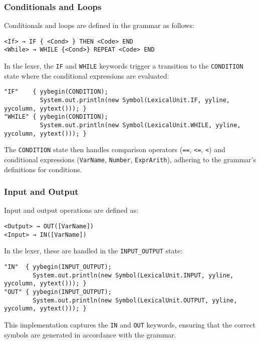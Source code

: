 \documentclass{article}
\begin{document}
	\subsubsection{Conditionals and Loops}
	Conditionals and loops are defined in the grammar as follows:

	\begin{verbatim}
<If> → IF { <Cond> } THEN <Code> END
<While> → WHILE {<Cond>} REPEAT <Code> END
	\end{verbatim}

	In the lexer, the \texttt{IF} and \texttt{WHILE} keywords trigger a transition to the \texttt{CONDITION} state where the conditional expressions are evaluated:

	\begin{verbatim}
"IF"    { yybegin(CONDITION);
          System.out.println(new Symbol(LexicalUnit.IF, yyline, yycolumn, yytext())); }
"WHILE" { yybegin(CONDITION);
          System.out.println(new Symbol(LexicalUnit.WHILE, yyline, yycolumn, yytext())); }
	\end{verbatim}

	The \texttt{CONDITION} state then handles comparison operators (\texttt{==}, \texttt{<=}, \texttt{<}) and conditional expressions (\texttt{VarName}, \texttt{Number}, \texttt{ExprArith}), adhering to the grammar's definitions for conditions.

	\subsubsection{Input and Output}
	Input and output operations are defined as:

	\begin{verbatim}
<Output> → OUT([VarName])
<Input> → IN([VarName])
	\end{verbatim}

	In the lexer, these are handled in the \texttt{INPUT\_OUTPUT} state:

	\begin{verbatim}
"IN"  { yybegin(INPUT_OUTPUT);
        System.out.println(new Symbol(LexicalUnit.INPUT, yyline, yycolumn, yytext())); }
"OUT" { yybegin(INPUT_OUTPUT);
        System.out.println(new Symbol(LexicalUnit.OUTPUT, yyline, yycolumn, yytext())); }
	\end{verbatim}

	This implementation captures the \texttt{IN} and \texttt{OUT} keywords, ensuring that the correct symbols are generated in accordance with the grammar.
\end{document}
